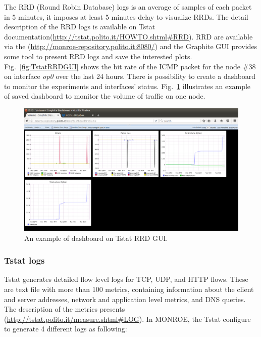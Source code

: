 \documentclass[a4paper,10pt]{article}
\begin{document}
The RRD (Round Robin Database) logs is an average of samples of each packet in 5 minutes, it imposes at least 5 minutes delay to visualize RRDs. The detail description of the RRD logs is available on Tstat documentation(\url{http://tstat.polito.it/HOWTO.shtml#RRD}). RRD are available via the (\url{http://monroe-repository.polito.it:8080/}) and the Graphite GUI provides some tool to present RRD logs and save the interested plots. Fig.~\ref{fig:TstatRRDGUI} shows the bit rate of the ICMP packet for the node \#38 on interface \textit{op0} over the last 24 hours. 
There is possibility to create a dashboard to monitor the experiments and interfaces' status. Fig.~\ref{fig:TStatGraphitedashboard} illustrates an example of saved dashboard to monitor the volume of traffic on one node. 

\begin{figure}[h]
	\centering
	\includegraphics[width=1.0\textwidth]{TStatGraphitedashboard.png}
	\caption{An example of dashboard on Tstat RRD GUI.}
	\label{fig:TStatGraphitedashboard}
\end{figure}


\subsubsection{Tstat logs}
Tstat generates detailed flow level logs for TCP, UDP, and HTTP flows. These are text file with more than 100 metrics, containing information about the client and server addresses, network and application level metrics, and DNS queries. The description of the metrics presents (\url{http://tstat.polito.it/measure.shtml#LOG}).
In MONROE, the Tstat configure to generate 4 different logs as following:
\end{document}
